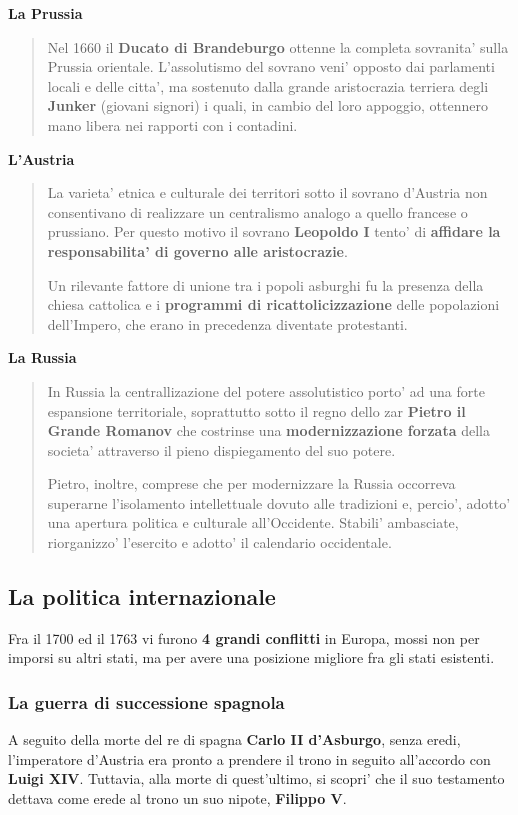 \documentclass{article}
\begin{document}
{{    \textbf{La Prussia}
    \begin{quote}
      Nel 1660 il \textbf{Ducato di Brandeburgo} ottenne la completa sovranita' sulla Prussia orientale. L'assolutismo del sovrano veni' opposto dai parlamenti locali e delle citta', ma sostenuto dalla grande aristocrazia terriera degli \textbf{Junker} \small{(giovani signori)} i quali, in cambio del loro appoggio, ottennero mano libera nei rapporti con i contadini.
    \end{quote}

    \textbf{L'Austria}
    \begin{quote}
      La varieta' etnica e culturale dei territori sotto il sovrano d'Austria non consentivano di realizzare un centralismo analogo a quello francese o prussiano. Per questo motivo il sovrano \textbf{Leopoldo I} tento' di \textbf{affidare la responsabilita' di governo alle aristocrazie}.

      Un rilevante fattore di unione tra i popoli asburghi fu la presenza della chiesa cattolica e i \textbf{programmi di ricattolicizzazione} delle popolazioni dell'Impero, che erano in precedenza diventate protestanti.
    \end{quote}

    \textbf{La Russia}
    \begin{quote}
      In Russia la centrallizazione del potere assolutistico porto' ad una forte espansione territoriale, soprattutto sotto il regno dello zar \textbf{Pietro il Grande Romanov} che costrinse una \textbf{modernizzazione forzata} della societa' attraverso il pieno dispiegamento del suo potere.

      Pietro, inoltre, comprese che per modernizzare la Russia occorreva superarne l'isolamento intellettuale dovuto alle tradizioni e, percio', adotto' una apertura politica e culturale all'Occidente. Stabili' ambasciate, riorganizzo' l'esercito e adotto' il calendario occidentale.
    \end{quote}

    \subsection{La politica internazionale}
    Fra il 1700 ed il 1763 vi furono \textbf{4 grandi conflitti} in Europa, mossi non per imporsi su altri stati, ma per avere una posizione migliore fra gli stati esistenti.

    \subsubsection{La guerra di successione spagnola} %
    A seguito della morte del re di spagna \textbf{Carlo II d'Asburgo}, senza eredi, l'imperatore d'Austria era pronto a prendere il trono in seguito all'accordo con \textbf{Luigi XIV}. Tuttavia, alla morte di quest'ultimo, si scopri' che il suo testamento dettava come erede al trono un suo nipote, \textbf{Filippo V}.

}}
\end{document}
